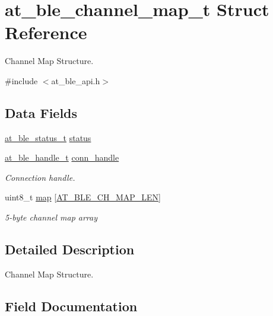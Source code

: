 \hypertarget{structat__ble__channel__map__t}{}\section{at\+\_\+ble\+\_\+channel\+\_\+map\+\_\+t Struct Reference}
\label{structat__ble__channel__map__t}


Channel Map Structure.  




{\ttfamily \#include $<$at\+\_\+ble\+\_\+api.\+h$>$}

\subsection*{Data Fields}
\begin{DoxyCompactItemize}
\item 
\mbox{\hyperlink{group__error__codes__group_ga3b1db9b95feb157b3c188ca27fe76988}{at\+\_\+ble\+\_\+status\+\_\+t}} \mbox{\hyperlink{structat__ble__channel__map__t_a0b48093fc2030779fc47e5216f8019e2}{status}}
\item 
\mbox{\hyperlink{at__ble__api_8h_abd23646d0c662860741f787efc8456f2}{at\+\_\+ble\+\_\+handle\+\_\+t}} \mbox{\hyperlink{structat__ble__channel__map__t_ae42df6fd8493f8f8faeccfdd6062e96f}{conn\+\_\+handle}}
\begin{DoxyCompactList}\small\item\em Connection handle. \end{DoxyCompactList}\item 
uint8\+\_\+t \mbox{\hyperlink{structat__ble__channel__map__t_a527caa0b30295896bbac2ecf6c4fe3c9}{map}} \mbox{[}\mbox{\hyperlink{at__ble__api_8h_a37a6c24e6d883e348476b9d3d0b067c2}{A\+T\+\_\+\+B\+L\+E\+\_\+\+C\+H\+\_\+\+M\+A\+P\+\_\+\+L\+EN}}\mbox{]}
\begin{DoxyCompactList}\small\item\em 5-\/byte channel map array \end{DoxyCompactList}\end{DoxyCompactItemize}


\subsection{Detailed Description}
Channel Map Structure. 

\subsection{Field Documentation}
\mbox{\label{structat__ble__channel__map__t_ae42df6fd8493f8f8faeccfdd6062e96f}} 
